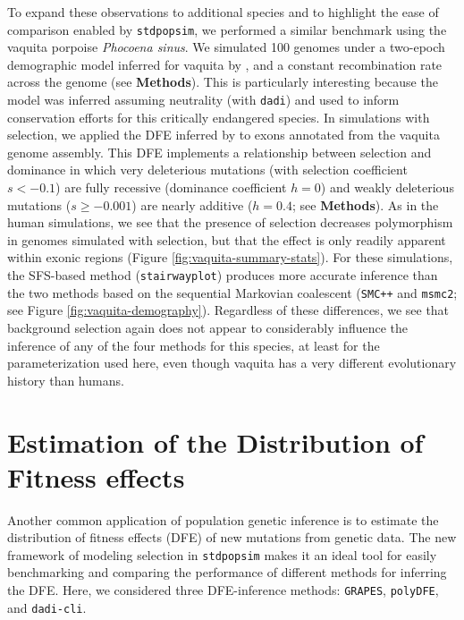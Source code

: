 \documentclass[hidelinks]{article}
\newcommand{\stdpopsim}{\texttt{stdpopsim}\xspace}
\newcommand{\msmc}{\texttt{msmc2}\xspace}
\newcommand{\stairway}{\texttt{stairwayplot}\xspace}
\newcommand{\smcpp}{\texttt{SMC++}\xspace}
\newcommand{\polydfe}{\texttt{polyDFE}\xspace}
\newcommand{\dadicli}{\texttt{dadi-cli}\xspace}
\newcommand{\dadi}{\texttt{dadi}\xspace}
\newcommand{\grapes}{\texttt{GRAPES}\xspace}
\begin{document}
    To expand these observations to additional species and to highlight the ease of comparison enabled by \stdpopsim,
    we performed a similar benchmark using the vaquita porpoise \textit{Phocoena sinus}.
    We simulated 100 genomes under a two-epoch demographic model inferred for vaquita by \textcite{robinson2022critically},
    and a constant recombination rate across the genome (see \textbf{Methods}).
    This is particularly interesting because the model was inferred assuming neutrality (with \dadi)
    and used to inform conservation efforts for this critically endangered species. 
    In simulations with selection, we applied the DFE inferred by \textcite{robinson2022critically} to exons
    annotated from the vaquita genome assembly.
    This DFE implements a relationship between selection and dominance
    in which very deleterious mutations (with selection coefficient $s<-0.1$) are fully recessive
    (dominance coefficient $h=0$) and weakly deleterious mutations ($s\geq -0.001$) are nearly
    additive ($h=0.4$; see \textbf{Methods}).
    As in the human simulations, we see that the presence of selection
    decreases polymorphism in genomes simulated with selection, but that the effect
    is only readily apparent within exonic regions (Figure \ref{fig:vaquita-summary-stats}).
    For these simulations, the SFS-based method (\stairway) produces more accurate
    inference than the two methods based on the sequential Markovian coalescent
    (\smcpp and \msmc; see Figure \ref{fig:vaquita-demography}).
    Regardless of these differences, we see that background selection again does not
    appear to considerably influence the inference of any of the four methods for this species,
    at least for the parameterization used here,
    even though vaquita has a very different evolutionary history than humans.




\section*{Estimation of the Distribution of Fitness effects}
    \label{dfe}
    Another common application of population genetic inference is to estimate the distribution of fitness effects (DFE) of new mutations
    from genetic data. The new framework of modeling selection in \stdpopsim makes it an ideal tool for easily benchmarking and comparing
    the performance of different methods for inferring the DFE.
    Here, we considered three DFE-inference methods:
    \grapes \citep{galtier2016adaptive}, \polydfe \citep{tataru2020polydfe}, and \dadicli \citep{Huang2023}.
\end{document}
